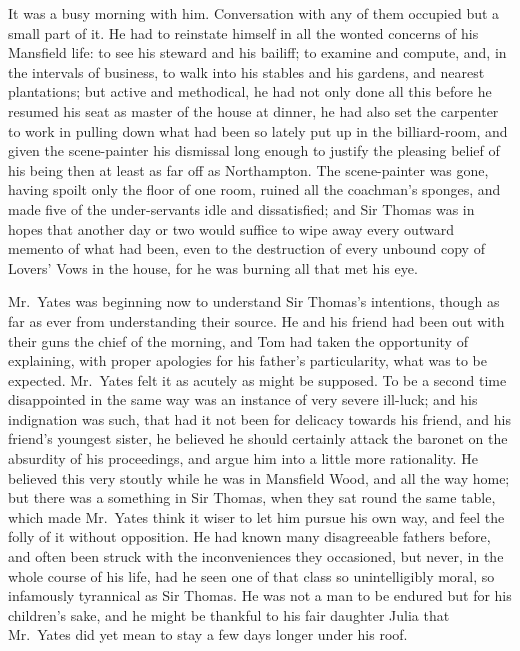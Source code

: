 \documentclass{article}
\begin{document}
It was a busy morning with him.  Conversation with any
of them occupied but a small part of it.  He had to
reinstate himself in all the wonted concerns of his
Mansfield life:  to see his steward and his bailiff;
to examine and compute, and, in the intervals
of business, to walk into his stables and his gardens,
and nearest plantations; but active and methodical,
he had not only done all this before he resumed his seat
as master of the house at dinner, he had also set the
carpenter to work in pulling down what had been so lately
put up in the billiard-room, and given the scene-painter
his dismissal long enough to justify the pleasing belief
of his being then at least as far off as Northampton.
The scene-painter was gone, having spoilt only the
floor of one room, ruined all the coachman's sponges,
and made five of the under-servants idle and dissatisfied;
and Sir Thomas was in hopes that another day or two would
suffice to wipe away every outward memento of what had been,
even to the destruction of every unbound copy of Lovers'
Vows in the house, for he was burning all that met his eye.

Mr.\ Yates was beginning now to understand Sir Thomas's intentions,
though as far as ever from understanding their source.
He and his friend had been out with their guns the chief of
the morning, and Tom had taken the opportunity of explaining,
with proper apologies for his father's particularity,
what was to be expected.  Mr.\ Yates felt it as acutely
as might be supposed.  To be a second time disappointed
in the same way was an instance of very severe ill-luck;
and his indignation was such, that had it not been for delicacy
towards his friend, and his friend's youngest sister,
he believed he should certainly attack the baronet on
the absurdity of his proceedings, and argue him into a
little more rationality.  He believed this very stoutly
while he was in Mansfield Wood, and all the way home;
but there was a something in Sir Thomas, when they sat
round the same table, which made Mr.\ Yates think it wiser
to let him pursue his own way, and feel the folly of it
without opposition.  He had known many disagreeable
fathers before, and often been struck with the inconveniences
they occasioned, but never, in the whole course of his life,
had he seen one of that class so unintelligibly moral,
so infamously tyrannical as Sir Thomas.  He was not a man
to be endured but for his children's sake, and he might
be thankful to his fair daughter Julia that Mr.\ Yates
did yet mean to stay a few days longer under his roof.
\end{document}
